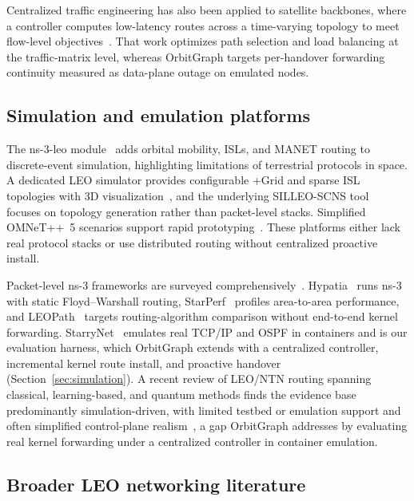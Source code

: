 Centralized traffic engineering has also been applied to satellite backbones,
where a controller computes low-latency routes across a time-varying topology to
meet flow-level objectives~\cite{wu:sate-satellite-te:2025}.
That work optimizes path selection and load balancing at the traffic-matrix
level, whereas OrbitGraph targets per-handover forwarding continuity measured as
data-plane outage on emulated nodes.

\subsection{Simulation and emulation platforms}

The ns-3-leo module~\cite{ns3leo2022} adds orbital mobility, ISLs, and MANET
routing to discrete-event simulation, highlighting limitations of terrestrial
protocols in space.
A dedicated LEO simulator provides configurable +Grid and sparse ISL topologies
with 3D visualization~\cite{kempton:network-simulator:2021}, and the underlying
SILLEO-SCNS tool~\cite{kempton2020silleo,online:silleo:2025} focuses on topology
generation rather than packet-level stacks.
Simplified OMNeT++~5 scenarios support rapid
prototyping~\cite{dewangan:simple-omnet:2017}.
These platforms either lack real protocol stacks or use distributed routing
without centralized proactive install.

Packet-level ns-3 frameworks are surveyed
comprehensively~\cite{manzanareslopez2025comprehensive}.
Hypatia~\cite{kassing2020exploring} runs ns-3 with static Floyd--Warshall
routing, StarPerf~\cite{lai2020starperf} profiles area-to-area performance, and
LEOPath~\cite{leopath2024} targets routing-algorithm comparison without
end-to-end kernel forwarding.
StarryNet~\cite{lai2023starrynet} emulates real TCP/IP and OSPF in containers
and is our evaluation harness, which OrbitGraph extends with a centralized
controller, incremental kernel route install, and proactive handover
(Section~\ref{sec:simulation}).
A recent review of LEO/NTN routing spanning classical, learning-based, and
quantum methods finds the evidence base predominantly simulation-driven, with
limited testbed or emulation support and often simplified control-plane
realism~\cite{mattar:leo-ntn-routing-perspectives:2026}, a gap OrbitGraph
addresses by evaluating real kernel forwarding under a centralized controller in
container emulation.

\subsection{Broader LEO networking literature}

